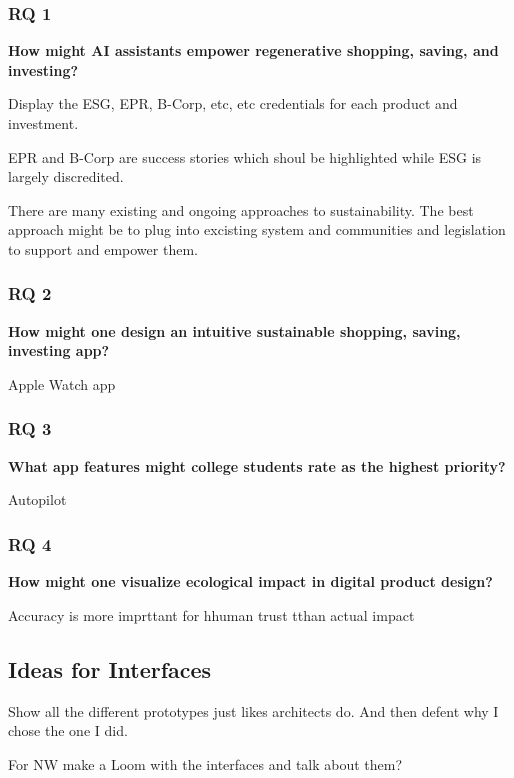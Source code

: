 \documentclass[
  letterpaper,
  DIV=11,
  numbers=noendperiod]{scrartcl}
\begin{document}
\subsubsection{RQ 1}\label{rq-1}

\textbf{How might AI assistants empower regenerative shopping, saving,
and investing?}

Display the ESG, EPR, B-Corp, etc, etc credentials for each product and
investment.

EPR and B-Corp are success stories which shoul be highlighted while ESG
is largely discredited.

There are many existing and ongoing approaches to sustainability. The
best approach might be to plug into excisting system and communities and
legislation to support and empower them.

\subsubsection{RQ 2}\label{rq-2}

\textbf{How might one design an intuitive sustainable shopping, saving,
investing app?}

Apple Watch app

\subsubsection{RQ 3}\label{rq-3}

\textbf{What app features might college students rate as the highest
priority?}

Autopilot

\subsubsection{RQ 4}\label{rq-4}

\textbf{How might one visualize ecological impact in digital product
design?}

Accuracy is more imprttant for hhuman trust tthan actual impact

\subsection{Ideas for Interfaces}\label{ideas-for-interfaces}

Show all the different prototypes just likes architects do. And then
defent why I chose the one I did.

For NW make a Loom with the interfaces and talk about them?
\end{document}
